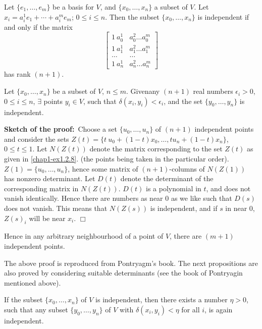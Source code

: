 \begin{ex}\label{chap1-ex1.2.8}
Let $\{e_{1},\ldots,e_{m}\}$ be a basis for $V$, and $\{x_{0},\ldots,x_{n}\}$ a subset of $V$. Let $x_{i}=a^1_i e_{1}+\cdots+a^{m}_ie_{m}$; $0\leq i\leq n$. Then the subset $\{x_{0},\ldots,x_{n}\}$ is independent if and only if the matrix
$$
\begin{bmatrix}
1\ a^{1}_{0} & a^{2}_{0}\ldots a^{m}_{0}\\
1\ a^{1}_{1} & a^{2}_{1}\ldots a^{m}_{1}\\
\ldots & \ldots\\
1\ a^{1}_{n} & a^{2}_{n}\ldots a^{m}_{n}
\end{bmatrix}
$$
has rank $(n+1)$. 
\end{ex}

\begin{proposition}\label{chap1-prop1.2.9}
Let $\{x_{0},\ldots,x_{n}\}$ be a subset of $V$, $n\leq m$. Given\pageoriginale any $(n+1)$ real numbers $\epsilon_{i}>0$, $0\leq i\leq n$, $\exists$ points $y_{i}\in V$, such that $\delta(x_{i},y_{i})<\epsilon_{i}$, and the set $\{y_{0},\ldots,y_{n}\}$ is independent.
\end{proposition}

\noindent
{\bf Sketch of the proof:}~Choose a set $\{u_{0},\ldots,u_{n}\}$ of $(n+1)$ independent points and consider the sets $Z(t)=\{t\ u_{0}+(1-t)x_{0},\ldots,t u_{n}+(1-t)x_{n}\}$, $0\leq t\leq 1$. Let $N(Z(t))$ denote the matrix corresponding to the set $Z(t)$ as given in \ref{chap1-ex1.2.8}. (the points being taken in the particular order). $Z(1)=\{u_{0},\ldots,u_{n}\}$, hence some matrix of $(n+1)$-columns of $N(Z(1))$ has nonzero determinant. Let $D(t)$ denote the determinant of the corresponding matrix in $N(Z(t))$. $D(t)$ is a polynomial in $t$, and does not vanish identically. Hence there are numbers as near $0$ as we like such that $D(s)$ does not vanish. This means that $N(Z(s))$ is independent, and if $s$ in near $0$, $Z(s)_{i}$ will be near $x_{i}$. \hfill$\Box$

Hence in any arbitrary neighbourhood of a point of $V$, there are $(m+1)$ independent points.

The above proof is reproduced from Pontryagm's book. The next propositions are also proved by considering suitable determinants (see the book of Pontryagin mentioned above).

\begin{ex}\label{chap1-ex1.2.10}
If the subset $\{x_{0},\ldots,x_{n}\}$ of $V$ is independent, then there exists a number $\eta>0$, such that any subset $\{y_{0},\ldots,y_{n}\}$ of $V$ with $\delta(x_{i},y_{i})<\eta$ for all $i$, is again independent.
\end{ex}

